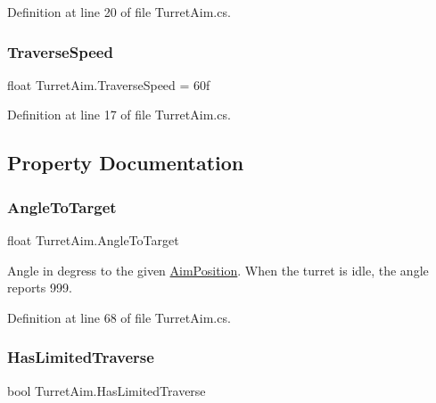 Definition at line 20 of file Turret\+Aim.\+cs.

\mbox{\label{class_turret_aim_a0d95f826ffb966894820a781ea3fc04c}} 
\subsubsection{\texorpdfstring{Traverse\+Speed}{TraverseSpeed}}
{\footnotesize\ttfamily float Turret\+Aim.\+Traverse\+Speed = 60f}



Definition at line 17 of file Turret\+Aim.\+cs.



\subsection{Property Documentation}
\mbox{\label{class_turret_aim_ae9892ac1ac8c471d11d9a99c2849542c}} 
\subsubsection{\texorpdfstring{Angle\+To\+Target}{AngleToTarget}}
{\footnotesize\ttfamily float Turret\+Aim.\+Angle\+To\+Target\hspace{0.3cm}{\ttfamily [get]}}



Angle in degress to the given \hyperlink{class_turret_aim_a194f5413aa939b8cbb8a5a9edf2c8660}{Aim\+Position}. When the turret is idle, the angle reports 999. 



Definition at line 68 of file Turret\+Aim.\+cs.

\mbox{\label{class_turret_aim_ac4f7699c9a91fa48dd95b2f08cf03fd6}} 
\subsubsection{\texorpdfstring{Has\+Limited\+Traverse}{HasLimitedTraverse}}
{\footnotesize\ttfamily bool Turret\+Aim.\+Has\+Limited\+Traverse\hspace{0.3cm}{\ttfamily [get]}}



